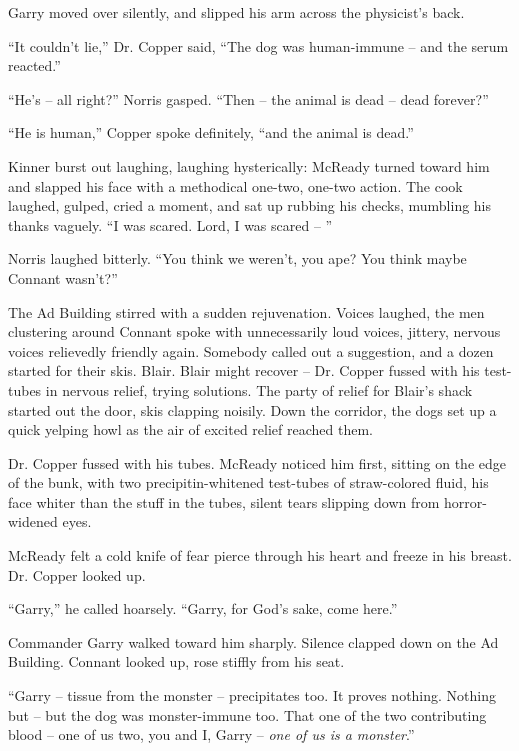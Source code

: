 \documentclass[letterpaper,openany,12pt]{memoir}		%
\begin{document}
Garry moved over silently, and slipped his arm across the physicist's back.

``It couldn't lie,'' Dr. Copper said, ``The dog was human-immune -- and the
serum reacted.''

``He's -- all right?'' Norris gasped. ``Then -- the animal is dead -- dead
forever?''

``He is human,'' Copper spoke definitely, ``and the animal is dead.''

Kinner burst out laughing, laughing hysterically: McReady turned toward him and
slapped his face with a methodical one-two, one-two action. The cook laughed,
gulped, cried a moment, and sat up rubbing his checks, mumbling his thanks
vaguely. ``I was scared. Lord, I was scared -- ''

Norris laughed bitterly. ``You think we weren't, you ape? You think maybe
Connant wasn't?''

The Ad Building stirred with a sudden rejuvenation. Voices laughed, the men
clustering around Connant spoke with unnecessarily loud voices, jittery, nervous
voices relievedly friendly again. Somebody called out a suggestion, and a dozen
started for their skis. Blair. Blair might recover -- Dr. Copper fussed with his
test-tubes in nervous relief, trying solutions. The party of relief for Blair's
shack started out the door, skis clapping noisily. Down the corridor, the dogs
set up a quick yelping howl as the air of excited relief reached them.

Dr. Copper fussed with his tubes. McReady noticed him first, sitting on the edge
of the bunk, with two precipitin-whitened test-tubes of straw-colored fluid, his
face whiter than the stuff in the tubes, silent tears slipping down from
horror-widened eyes.

McReady felt a cold knife of fear pierce through his heart and freeze in his
breast. Dr. Copper looked up.

``Garry,'' he called hoarsely. ``Garry, for God's sake, come here.''

Commander Garry walked toward him sharply. Silence clapped down on the Ad
Building. Connant looked up, rose stiffly from his seat.

``Garry -- tissue from the monster -- precipitates too. It proves nothing.
Nothing but -- but the dog was monster-immune too. That one of the two
contributing blood -- one of us two, you and I, Garry -- \emph{one of us is a
monster}.''


\end{document}
